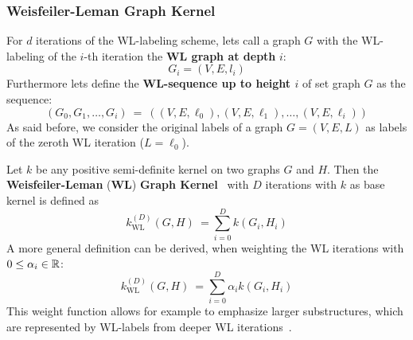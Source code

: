 	\subsubsection{Weisfeiler-Leman Graph Kernel} \label{subsec:def_WLkernel}
		For $d$ iterations of the WL-labeling scheme, lets call a graph $G$ with the WL-labeling of the $i$-th iteration the \textbf{WL graph at depth} $i$:
		\[ G_i = (V,E,l_i) \]
		Furthermore lets define the \textbf{WL-sequence up to height $i$} of set graph $G$ as the sequence:
		\[ ( G_0,G_1,\dots,G_i ) \ = \ ( (V,E,\ell_0),(V,E,\ell_1), \dots,(V,E,\ell_i) ) \]
		As said before, we consider the original labels of a graph $G=(V,E,L)$ as labels of the zeroth WL iteration ($L=\ell_0$).
		
		Let $k$ be any positive semi-definite kernel on two graphs $G$ and $H$. 
		Then the \textbf{Weisfeiler-Leman} (\textbf{WL}) \textbf{Graph Kernel}~\cite{2011_Shervashidze_JMLR} with $D$ iterations with $k$ as base kernel is defined as
		\[ k_{\text{WL}}^{(D)}(G, H) \ = \sum_{i=0}^{D} k(G_i,H_i) \]
		A more general definition can be derived, when weighting the WL iterations with $0\le \alpha_i\in \mathbb{R}$:
		\[ k_{\text{WL}}^{(D)}(G, H) \ = \sum_{i=0}^{D} \alpha_i k(G_i,H_i) \]
		This weight function allows for example to emphasize larger substructures, which are represented by WL-labels from deeper WL iterations~\cite{2021_Schulz_CONF}.
	
